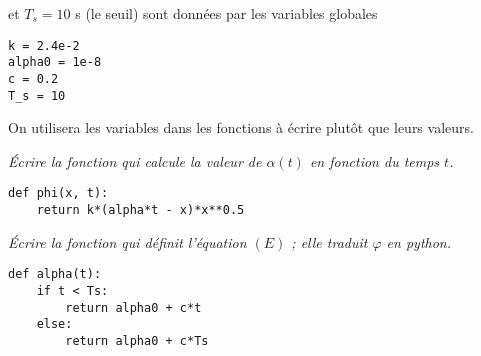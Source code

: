 et $T_s = 10$ s (le seuil) sont données par les variables globales
\begin{lstlisting}
k = 2.4e-2 
alpha0 = 1e-8
c = 0.2
T_s = 10
\end{lstlisting}
On utilisera les variables dans les fonctions à écrire plutôt que leurs valeurs.
\begin{Exercise}\it
Écrire la fonction  qui calcule la valeur de $\alpha(t)$ en fonction du temps $t$.
\end{Exercise}
\begin{Answer}
\begin{lstlisting}
def phi(x, t):
    return k*(alpha*t - x)*x**0.5
\end{lstlisting}
\end{Answer}
\begin{Exercise}\it
Écrire la fonction  qui définit l'équation $(E)$ ; elle traduit $\varphi$ en python.
\end{Exercise}
\begin{Answer}
\begin{lstlisting}
def alpha(t):
    if t < Ts:
        return alpha0 + c*t
    else:
        return alpha0 + c*Ts
\end{lstlisting}
\newpage
\end{Answer}
\newpage

